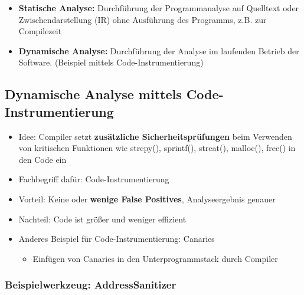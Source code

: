 \documentclass[openany]{book}
\begin{document}
\begin{itemize}
    \item \textbf{Statische Analyse:} Durchführung der Programmanalyse auf Quelltext oder Zwischendarstellung (IR) ohne Ausführung des Programms, z.B. zur Compilezeit
    \item \textbf{Dynamische Analyse:} Durchführung der Analyse im laufenden Betrieb der Software. (Beispiel mittels Code-Instrumentierung)
\end{itemize}

\subsection{Dynamische Analyse mittels Code-Instrumentierung}

\begin{itemize}
    \item Idee: Compiler setzt \textbf{zusätzliche Sicherheitsprüfungen} beim Verwenden von kritischen Funktionen wie strcpy(), sprintf(), strcat(), malloc(), free() in den Code ein
    \item Fachbegriff dafür: Code-Instrumentierung
    \item Vorteil: Keine oder \textbf{wenige False Positives}, Analyseergebnis genauer
    \item Nachteil: Code ist größer und weniger effizient
    \item Anderes Beispiel für Code-Instrumentierung: Canaries
    \begin{itemize}
        \item Einfügen von Canaries in den Unterprogrammstack durch Compiler
    \end{itemize}
\end{itemize}

\subsubsection{Beispielwerkzeug: AddressSanitizer}
\end{document}
